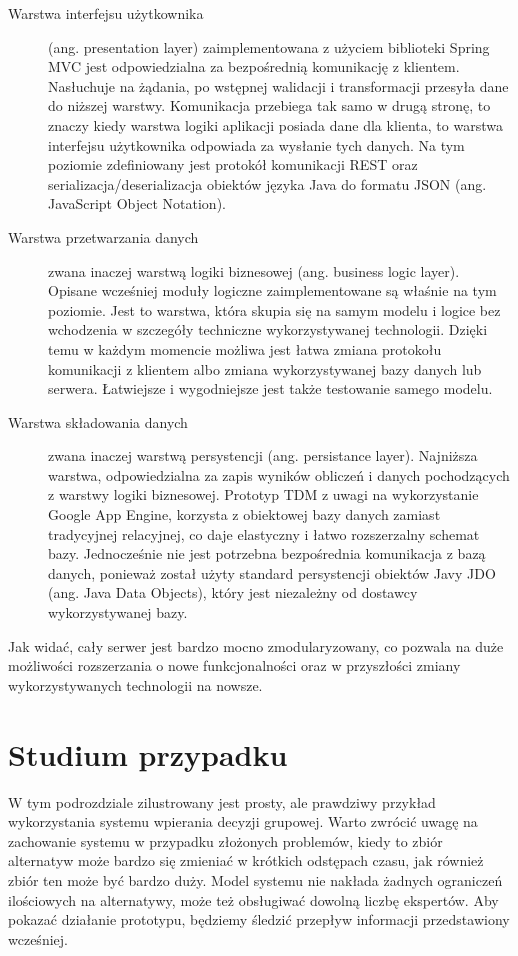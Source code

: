 \begin{description}
  \item[Warstwa interfejsu użytkownika] (ang. presentation
  layer) zaimplementowana z użyciem biblioteki Spring MVC jest odpowiedzialna za
  bezpośrednią komunikację z klientem.
  Nasłuchuje na żądania, po wstępnej walidacji i transformacji przesyła dane do
  niższej warstwy. Komunikacja przebiega tak samo w drugą stronę, to znaczy
  kiedy warstwa logiki aplikacji posiada dane dla klienta, to warstwa interfejsu
  użytkownika odpowiada za wysłanie tych danych. Na tym poziomie zdefiniowany
  jest protokół komunikacji REST oraz serializacja/deserializacja obiektów
  języka Java do formatu JSON (ang. JavaScript Object Notation).
  
  \item[Warstwa przetwarzania danych] zwana inaczej warstwą logiki biznesowej
  (ang. business logic layer). Opisane wcześniej moduły logiczne
  zaimplementowane są właśnie na tym poziomie. Jest to warstwa, która skupia się
  na samym modelu i logice bez wchodzenia w szczegóły techniczne wykorzystywanej
  technologii. Dzięki temu w każdym momencie możliwa jest łatwa zmiana protokołu
  komunikacji z klientem albo zmiana wykorzystywanej bazy danych lub serwera.
  Łatwiejsze i wygodniejsze jest także testowanie samego modelu.
  
  \item[Warstwa składowania danych] zwana inaczej warstwą persystencji (ang.
  persistance layer). Najniższa warstwa, odpowiedzialna za zapis wyników
  obliczeń i danych pochodzących z warstwy logiki biznesowej. Prototyp TDM z
  uwagi na wykorzystanie Google App Engine, korzysta z obiektowej bazy danych
  zamiast tradycyjnej relacyjnej, co daje elastyczny i łatwo rozszerzalny
  schemat bazy. Jednocześnie nie jest potrzebna bezpośrednia komunikacja z bazą
  danych, ponieważ został użyty standard persystencji obiektów Javy JDO (ang.
  Java Data Objects), który jest niezależny od dostawcy wykorzystywanej bazy.
\end{description}
Jak widać, cały serwer jest bardzo mocno zmodularyzowany, co pozwala na duże
możliwości rozszerzania o nowe funkcjonalności oraz w przyszłości zmiany
wykorzystywanych technologii na nowsze.

\section{Studium przypadku}
W tym podrozdziale zilustrowany jest prosty, ale prawdziwy przykład
wykorzystania systemu wpierania decyzji grupowej. Warto zwrócić uwagę na
zachowanie systemu w przypadku złożonych problemów, kiedy to zbiór alternatyw
może bardzo się zmieniać w krótkich odstępach czasu, jak również zbiór ten może
być bardzo duży. Model systemu nie nakłada żadnych ograniczeń ilościowych na
alternatywy, może też obsługiwać dowolną liczbę ekspertów. Aby pokazać działanie
prototypu, będziemy śledzić przepływ informacji przedstawiony wcześniej.

